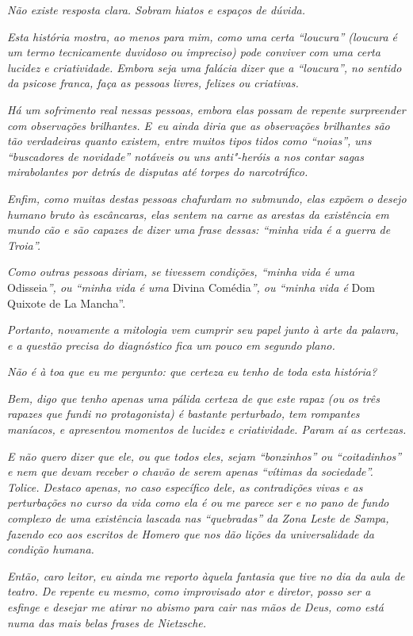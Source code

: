 \emph{Não existe resposta clara. Sobram hiatos e espaços de dúvida.}

\emph{Esta história mostra, ao menos para mim, como uma certa ``loucura''
(loucura é um termo tecnicamente duvidoso ou impreciso) pode conviver
com uma certa lucidez e criatividade. Embora seja uma falácia dizer que
a ``loucura'', no sentido da psicose franca, faça as pessoas livres,
felizes ou criativas.}

\emph{Há um sofrimento real nessas pessoas, embora elas possam de
repente surpreender com observações brilhantes. E~eu ainda diria que as
observações brilhantes são tão verdadeiras quanto existem, entre muitos
tipos tidos como ``noias'', uns ``buscadores de novidade'' notáveis ou
uns anti"-heróis a nos contar sagas mirabolantes por detrás de disputas
até torpes do narcotráfico.}

\emph{Enfim, como muitas destas pessoas chafurdam no submundo, elas
expõem o desejo humano bruto às escâncaras, elas sentem na carne as
arestas da existência em mundo cão e são capazes de dizer uma frase
dessas: ``minha vida é a guerra de Troia''.}

\emph{Como outras pessoas diriam, se tivessem condições, ``minha vida é
uma} Odisseia\emph{'', ou ``minha vida é uma} Divina Comédia\emph{'', ou ``minha vida
é} Dom Quixote de La Mancha''.

\emph{Portanto, novamente a mitologia vem cumprir seu papel junto à arte
da palavra, e a questão precisa do diagnóstico fica um pouco em segundo
plano.}

\emph{Não é à toa que eu me pergunto: que certeza eu tenho de toda esta
história?}

\emph{Bem, digo que tenho apenas uma pálida certeza de que este rapaz
(ou os três rapazes que fundi no protagonista) é bastante perturbado,
tem rompantes maníacos, e apresentou momentos de lucidez e criatividade.
Param aí as certezas.}

\emph{E não quero dizer que ele, ou que todos eles, sejam ``bonzinhos''
ou ``coitadinhos'' e nem que devam receber o chavão de serem apenas
``vítimas da sociedade''. Tolice. Destaco apenas, no caso específico
dele, as contradições vivas e as perturbações no curso da vida como ela
é ou me parece ser e no pano de fundo complexo de uma existência lascada
nas ``quebradas'' da Zona Leste de Sampa, fazendo eco aos escritos de
Homero que nos dão lições da universalidade da condição humana.}

\emph{Então, caro leitor, eu ainda me reporto àquela fantasia que tive
no dia da aula de teatro. De repente eu mesmo, como improvisado ator e
diretor, posso ser a esfinge e desejar me atirar no abismo para cair nas
mãos de Deus, como está numa das mais belas frases de Nietzsche.}

